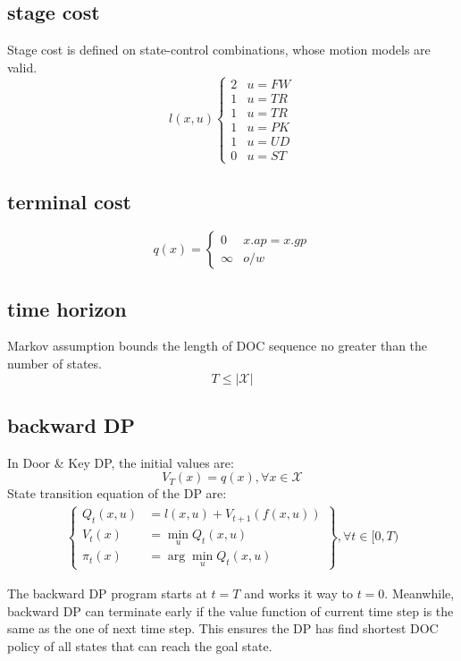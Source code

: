 \documentclass[conference]{IEEEtran}
\begin{document}
\subsection{stage cost}
\label{subsec:l}
Stage cost is defined on state-control combinations, whose motion models are valid.
$$
l(x ,u)\begin{cases}2&u=FW\\ 1&u=TR\\ 1&u=TR\\ 1&u=PK\\ 1&u=UD\\ 0&u=ST\end{cases} 
$$
\subsection{terminal cost}

$$
q\left( x\right)  =\begin{cases}0&x.ap=x.gp\\ \infty &o/w\end{cases} 
$$

\subsection{time horizon}
Markov assumption bounds the length of DOC sequence 
no greater than the number of states.
$$T \le |\mathcal{X}|$$

\subsection{backward DP}
In Door \& Key DP, the initial values are:
$$V_T(x) = q(x), \forall x \in \mathcal{X}$$
State transition equation of the DP are:
$$
\begin{gathered}
    \left\{\begin{aligned}
        Q_t(x,u) &= l(x,u) + V_{t+1}(f(x,u)) \\
        V_t(x) &= \min_u Q_t(x,u) \\
        \pi_t(x) &= \arg\min_u Q_t(x,u)
    \end{aligned}\right\}, \forall t \in [0, T)
\end{gathered}
$$

The backward DP program starts at $t=T$ and works it way to $t=0$.
Meanwhile, backward DP can terminate early if the value function of current time step
is the same as the one of next time step. 
This ensures the DP has find shortest DOC policy of all states that can reach the goal state.
\end{document}

